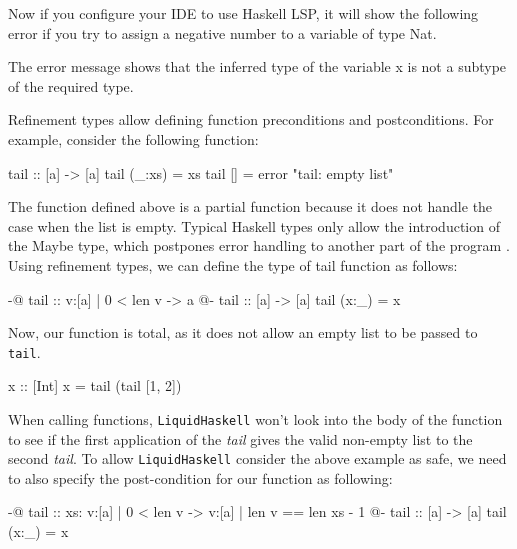 \documentclass[]{rptuseminar}
\begin{document}
Now if you configure your IDE to use Haskell LSP, it will show the following error if you try to assign a negative number
to a variable of type Nat.


The error message shows that the inferred type of the variable x is not a subtype of the required type.

Refinement types allow defining function preconditions and postconditions\cite{jhala_programming_2020}. 
For example, consider the following function:

\begin{haskell}
 tail :: [a] -> [a]
 tail (_:xs) = xs
 tail [] = error "tail: empty list"
\end{haskell}

The function defined above is a partial function because it does not handle the case when the list is empty. 
 Typical Haskell types only allow the introduction of the Maybe type, which postpones error 
 handling to another part of the program \cite{jhala_programming_2020}. Using refinement types, we can define the type of tail function as follows:

\begin{haskell}
 {-@ tail :: {v:[a] | 0 < len v} -> a @-}
 tail :: [a] -> [a]
 tail (x:_) = x
\end{haskell}

Now, our function is total, as it does not allow an empty list to be passed to \texttt{tail}.

\begin{haskell}
 x :: [Int]
 x = tail (tail [1, 2])
\end{haskell}

When calling functions, \texttt{LiquidHaskell} won't look into the body of the function to see if the first application of the \textit{tail} gives the valid non-empty list to the second \textit{tail}.
To allow \texttt{LiquidHaskell} consider the above example as safe, we need to also specify the post-condition for our function as following:

\begin{haskell}
 {-@ tail :: xs: {v:[a] | 0 < len v} -> {v:[a] | len v == len xs - 1} @-}
 tail :: [a] -> [a]
 tail (x:_) = x
\end{haskell}
\end{document}
